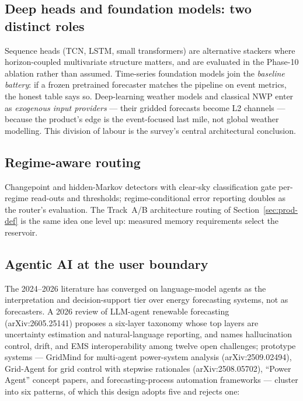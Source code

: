 \subsection{Deep heads and foundation models: two distinct roles}
Sequence heads (TCN, LSTM, small transformers) are alternative stackers
where horizon-coupled multivariate structure matters, and are evaluated in
the Phase-10 ablation rather than assumed. Time-series foundation models
join the \emph{baseline battery}: if a frozen pretrained forecaster matches
the pipeline on event metrics, the honest table says so. Deep-learning
weather models and classical NWP enter as \emph{exogenous input providers}
--- their gridded forecasts become L2 channels --- because the product's
edge is the event-focused last mile, not global weather modelling. This
division of labour is the survey's central architectural conclusion.

\subsection{Regime-aware routing}
Changepoint and hidden-Markov detectors with clear-sky classification gate
per-regime read-outs and thresholds; regime-conditional error reporting
doubles as the router's evaluation. The Track~A/B architecture routing of
Section~\ref{sec:prod-def} is the same idea one level up: measured memory
requirements select the reservoir.

\subsection{Agentic AI at the user boundary}
\label{sec:prod-survey-agent}
The 2024--2026 literature has converged on language-model agents as the
interpretation and decision-support tier over energy forecasting systems,
not as forecasters. A 2026 review of LLM-agent renewable forecasting
(arXiv:2605.25141) proposes a six-layer taxonomy whose top layers are
uncertainty estimation and natural-language reporting, and names
hallucination control, drift, and EMS interoperability among twelve open
challenges; prototype systems --- GridMind for multi-agent power-system
analysis (arXiv:2509.02494), Grid-Agent for grid control with stepwise
rationales (arXiv:2508.05702), ``Power Agent'' concept papers, and
forecasting-process automation frameworks --- cluster into six patterns, of
which this design adopts five and rejects one:

